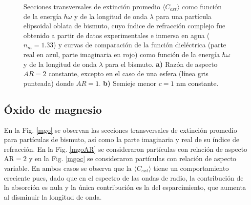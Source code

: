 \begin{figure}[H]
	\quad%
	\caption{Secciones transversales de extinción promedio $\langle C_{ext}\rangle$ como función de la energía $\hbar\omega$ y de la longitud de onda $\lambda$ para una partícula elipsoidal oblata de bismuto, cuyo índice de refracción complejo fue obtenido a partir de datos experimentales  e inmersa en agua ($n_m=1.33$) y curvas de comparación de la función dieléctrica (parte real en azul, parte imaginaria en rojo) como función de la energía $\hbar\omega$ y de la longitud de onda $\lambda$ para el bismuto. \textbf{a)} Razón de aspecto $AR=2$ constante, excepto en el caso de una esfera (línea gris punteada) donde $AR=1$. \textbf{b)} Semieje menor $c=1$ nm constante.}\label{bismuto}
\end{figure}


\subsection*{Óxido de magnesio}
En la Fig. \ref{mgo} se observan las secciones transversales de extinción promedio para partículas de bismuto, así como la parte imaginaria y real de su índice de refracción. En la Fig. \ref{mgoAR} se consideraron partículas con relación de aspecto AR$=2$  y en la Fig. \ref{mgoc} se consideraron partículas con relación de aspecto variable. En ambos casos se observa que la $\langle C_{ext}\rangle$ tiene un comportamiento creciente pues, dado que en el espectro de las ondas de radio, la contribución de la absorción es nula y la única contribución es la del esparcimiento, que aumenta al disminuir la longitud de onda.

